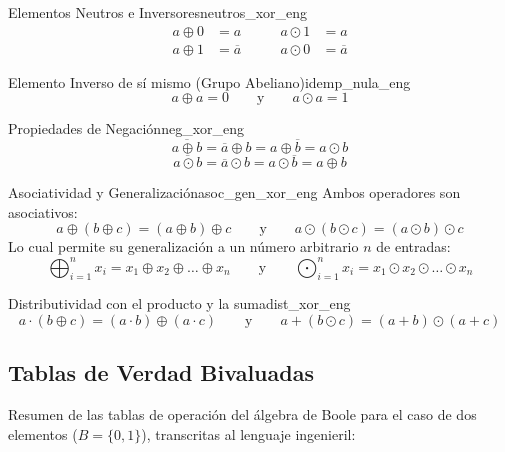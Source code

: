 \setcounter{tcb@cnt@teorema}{23}
\begin{teorema}{Elementos Neutros e Inversores}{neutros_xor_eng}
\begin{align*}
    a \oplus 0 &= a \qquad & a \odot 1 &= a \\
    a \oplus 1 &= \overline{a} \qquad & a \odot 0 &= \overline{a}
\end{align*}
\end{teorema}

\setcounter{tcb@cnt@teorema}{24}
\begin{teorema}{Elemento Inverso de sí mismo (Grupo Abeliano)}{idemp_nula_eng}
\[ a \oplus a = 0 \qquad \text{y} \qquad a \odot a = 1 \]
\end{teorema}

\setcounter{tcb@cnt@teorema}{25}
\begin{teorema}{Propiedades de Negación}{neg_xor_eng}
\[ \overline{a \oplus b} = \overline{a} \oplus b = a \oplus \overline{b} = a \odot b \]
\[ \overline{a \odot b} = \overline{a} \odot b = a \odot \overline{b} = a \oplus b \]
\end{teorema}

\setcounter{tcb@cnt@teorema}{26}
\begin{teorema}{Asociatividad y Generalización}{asoc_gen_xor_eng}
Ambos operadores son asociativos:
\[ a \oplus (b \oplus c) = (a \oplus b) \oplus c \qquad \text{y} \qquad a \odot (b \odot c) = (a \odot b) \odot c \]
Lo cual permite su generalización a un número arbitrario $n$ de entradas:
\[ \bigoplus_{i=1}^{n} x_i = x_1 \oplus x_2 \oplus \dots \oplus x_n \qquad \text{y} \qquad \bigodot_{i=1}^{n} x_i = x_1 \odot x_2 \odot \dots \odot x_n \]
\end{teorema}

\setcounter{tcb@cnt@teorema}{28}
\begin{teorema}{Distributividad con el producto y la suma}{dist_xor_eng}
\[ a \cdot (b \oplus c) = (a \cdot b) \oplus (a \cdot c) \qquad \text{y} \qquad a + (b \odot c) = (a + b) \odot (a + c) \]
\end{teorema}

\subsection*{Tablas de Verdad Bivaluadas}

Resumen de las tablas de operación del álgebra de Boole para el caso de dos elementos ($B=\{0,1\}$), transcritas al lenguaje ingenieril:

